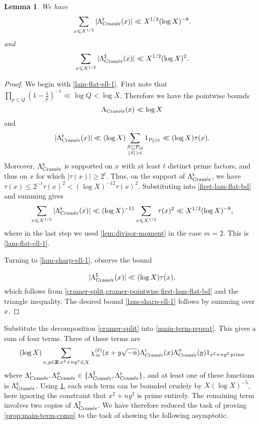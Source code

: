 \documentclass[11pt,reqno]{amsart}
\numberwithin{equation}{section}
\newtheorem{lemma}[theorem]{Lemma}
\theoremstyle{definition}
\theoremstyle{remark}
\newcommand{\mc}{\mathcal}
\renewcommand{\le}{\leqslant}
\renewcommand{\ge}{\geqslant}
\newcommand\Z{\mathbf{Z}}
\newcommand\cramer{{\textnormal{Cram\'er}}}
\begin{document}
\begin{lemma}\label{lem81}
We have
\begin{equation}\label{lam-flat-ell-1} \sum_{x \le X^{1/2}}  |\Lambda_{\cramer}^{\flat}(x)| \ll X^{1/2}(\log X)^{-8}.\end{equation}
and
\begin{equation}\label{lam-sharp-ell-1} \sum_{x \le X^{1/2}}  |\Lambda_{\cramer}^{\sharp}(x)| \ll X^{1/2}(\log X)^2.\end{equation}
\end{lemma}
\begin{proof}
We begin with \cref{lam-flat-ell-1}. First note that $\prod_{p \le Q} (1 - \frac{1}{p})^{-1} \ll \log Q < \log X$. Therefore we have the pointwise bounds
\begin{equation}\label{cramer-pointwise} \Lambda_{\cramer}(x) \ll \log X\end{equation} and 
\begin{equation}\label{first-lam-flat-bd} |\Lambda_{\cramer}^{\flat}(x)| \ll (\log X)\sum_{\substack{S \subseteq \mc{P}_Q \\ |S| > t}} 1_{P_S | x} \ll (\log X) \tau(x). \end{equation}
Moreover, $\Lambda_{\cramer}^{\flat}$ is supported on $x$ with at least $t$ distinct prime factors, and thus on $x$ for which $|\tau(x)| \ge 2^t$. Thus, on the support of $\Lambda_{\cramer}^{\flat}$, we have $\tau(x) \le 2^{-t} \tau(x)^2 < (\log X)^{-12} \tau(x)^2$. Substituting into \cref{first-lam-flat-bd} and summing gives
\[ \sum_{x \le X^{1/2}}  |\Lambda_{\cramer}^{\flat}(x)| \ll (\log X)^{-11} \sum_{x \le X^{1/2}}\tau(x)^2 \ll X^{1/2} (\log X)^{-8}, \] where in the last step we used  \cref{lem:divisor-moment} in the case $m = 2$. This is \cref{lam-flat-ell-1}.

Turning to \cref{lam-sharp-ell-1}, observe the bound 

\begin{equation}\label{lam-cramer-crude} |\Lambda_{\cramer}^{\sharp}(x)| \ll  (\log X) \tau(x),\end{equation} which follows from \cref{cramer-split,cramer-pointwise,first-lam-flat-bd} and the triangle inequality. The desired bound \cref{lam-sharp-ell-1} follows by summing over $x$.
\end{proof}

Substitute the decomposition \cref{cramer-split} into \cref{main-term-repeat}. This gives a sum of four terms. Three of these terms are
\[ (\log X) \sum_{x,y \in \Z: x^2 + ny^2\le X}
\chi_{\infty}^{(\ell)}(x + y \sqrt{-n})\Lambda'_{\cramer}(x)\Lambda''_{\cramer}(y) 1_{x^2 + ny^2 \operatorname{prime}}  \]
where $\Lambda'_{\cramer}, \Lambda''_{\cramer} \in \{ \Lambda_{\cramer}^{\sharp}, \Lambda_{\cramer}^{\flat}\}$, and at least one of these functions is $\Lambda_{\cramer}^{\flat}$. Using \cref{lem81}, each such term can be bounded crudely by $X (\log X)^{-5}$, here ignoring the constraint that $x^2 + ny^2$ is prime entirely. The remaining term involves two copies of $\Lambda_{\cramer}^{\sharp}$. We have therefore reduced the task of proving \cref{prop:main-term-comp} to the task of showing the following asymptotic.
\end{document}
